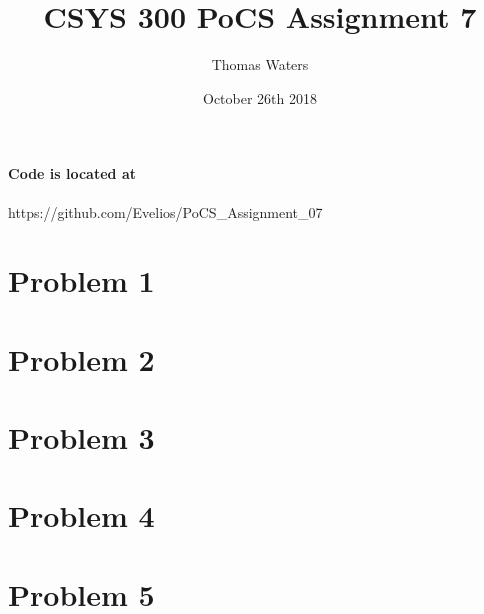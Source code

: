 \documentclass{article}
\title{CSYS 300 PoCS Assignment 7}
\author{Thomas Waters}
\date{October 26th 2018}
\begin{document}
\maketitle

\paragraph{Code is located at}
https://github.com/Evelios/PoCS\_Assignment\_07

\break

\section{Problem 1}


\section{Problem 2}


\section{Problem 3}


\section{Problem 4}


\section{Problem 5}

\end{document}
